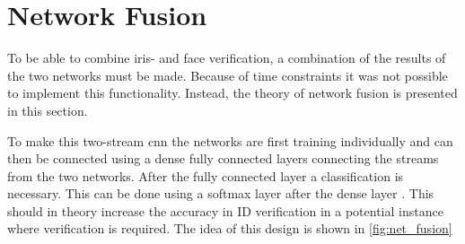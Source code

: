 \section{Network Fusion}
To be able to combine iris- and face verification, a combination of the results of the two networks must be made. Because of time constraints it was not possible to implement this functionality. Instead, the theory of network fusion is presented in this section.

To make this two-stream \gls{cnn} the networks are first training individually and can then be connected using a dense fully connected layers connecting the streams from the two networks. After the fully connected layer a classification is necessary. This can be done using a softmax layer after the dense layer \citep{Eitel2015}. This should in theory increase the accuracy in ID verification in a potential instance where verification is required. The idea of this design is shown in \autoref{fig:net_fusion}